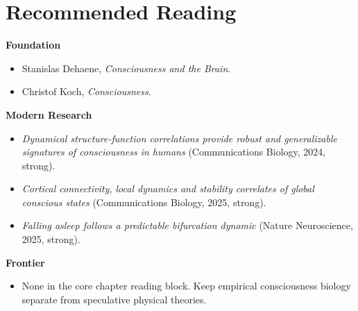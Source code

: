 \section{Recommended Reading}

\begin{readingbox}
\textbf{Foundation}
\begin{itemize}[nosep]
  \item Stanislas Dehaene, \emph{Consciousness and the Brain}.
  \item Christof Koch, \emph{Consciousness}.
\end{itemize}
\textbf{Modern Research}
\begin{itemize}[nosep]
  \item \emph{Dynamical structure-function correlations provide robust and
        generalizable signatures of consciousness in humans}
        (Communications Biology, 2024, strong).
  \item \emph{Cortical connectivity, local dynamics and stability correlates of
        global conscious states} (Communications Biology, 2025, strong).
  \item \emph{Falling asleep follows a predictable bifurcation dynamic}
        (Nature Neuroscience, 2025, strong).
\end{itemize}
\textbf{Frontier}
\begin{itemize}[nosep]
  \item None in the core chapter reading block. Keep empirical consciousness
        biology separate from speculative physical theories.
\end{itemize}
\end{readingbox}
